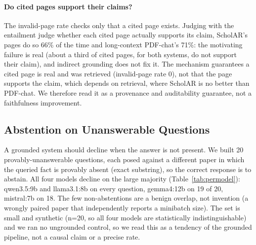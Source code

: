 \documentclass[11pt,letterpaper]{article}
\begin{document}
\paragraph{Do cited pages support their claims?} The invalid-page rate checks only that a cited
page exists. Judging with the entailment judge whether each cited page actually supports its claim,
ScholAR's pages do so 66\% of the time and long-context PDF-chat's 71\%: the motivating failure is
real (about a third of cited pages, for both systems, do not support their claim), and indirect
grounding does not fix it. The mechanism guarantees a cited page is real and was retrieved
(invalid-page rate 0), not that the page supports the claim, which depends on retrieval, where
ScholAR is no better than PDF-chat. We therefore read it as a provenance and auditability
guarantee, not a faithfulness improvement.

\subsection{Abstention on Unanswerable Questions}
\label{sec:abstention}
A grounded system should decline when the answer is not present. We built 20 provably-unanswerable
questions, each posed against a different paper in which the queried fact is provably absent (exact
substring), so the correct response is to abstain. All four models decline on the large majority
(Table~\ref{tab:permodel}): qwen3.5:9b and llama3.1:8b on every question, gemma4:12b on 19 of 20,
mistral:7b on 18. The few non-abstentions are a benign overlap, not invention (a wrongly paired
paper that independently reports a minibatch size). The set is small and synthetic (n=20, so all
four models are statistically indistinguishable) and we ran no ungrounded control, so we read this
as a tendency of the grounded pipeline, not a causal claim or a precise rate.
\end{document}
